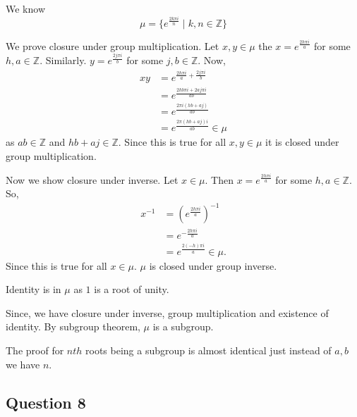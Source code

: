 \begin{solution}
  We know 
  \[ \mu  = \{e^{\frac{2k \pi i}{n} }\mid k,n \in \mathbb{Z}\}\]

  We prove closure under group multiplication. 
  Let \( x,y \in \mu  \) the \( x = e^{\frac{2h\pi i}{a}} \) for some \( h,a \in \mathbb{Z}\).
  Similarly. \( y = e^{\frac{2j\pi i}{b}} \) for some \( j,b \in \mathbb{Z} \). Now,
  \begin{align*}
    xy &= e^{\frac{2h\pi i}{a} + \frac{2j\pi i}{b}} \\
    &= e^{\frac{2hb\pi i + 2aj\pi i}{ab}} \\
    &= e^{\frac{2\pi i \left( hb + aj \right)}{ab}} \\
    &= e^{\frac{2\pi\left( hb + aj \right) i }{ab}} \in \mu 
  \end{align*}
  as \( ab \in \mathbb{Z} \) and \(  hb + aj \in \mathbb{Z} \). Since this is true for all \( x,y \in \mu  \) it is
  closed under group multiplication.

  Now we show closure under inverse. Let \( x \in \mu  \). Then
  \( x = e^{\frac{2h \pi i}{a}} \) for some \( h, a \in \mathbb{Z} \). So,
  \begin{align*}
    x^{-1} &= (e^{\frac{2 h \pi i}{a}})^{-1} \\
    &= e^{-\frac{2h \pi i}{a}} \\
    &= e^{\frac{2(-h) \pi i}{a}} \in \mu 
  .\end{align*}
  Since this is true for all \( x \in \mu  \). \( \mu  \) is closed under group inverse.

  Identity is in \( \mu  \) as \( 1  \) is a root of unity.

  Since, we have closure under inverse, group multiplication and existence of identity. By subgroup theorem, \( \mu  \) is a subgroup.

  The proof for \( nth \) roots being a subgroup is almost identical  just instead of \( a, b   \)    we have \( n \).
\end{solution}

\subsection{Question 8}

